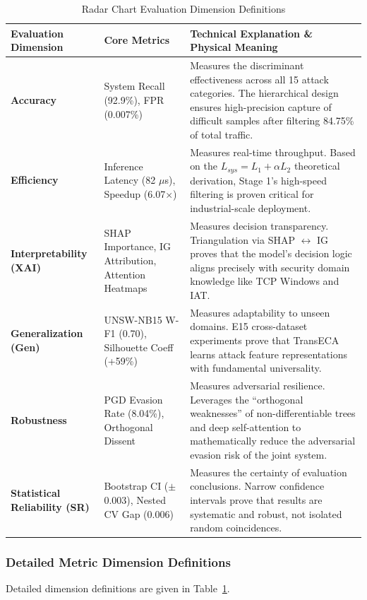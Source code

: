 \documentclass[sigconf]{acmart}
\begin{document}
\begin{table}[!t]
\caption{Radar Chart Evaluation Dimension Definitions}
\label{tab:radar_dimensions}
\begin{tabular}{p{3.0cm}p{5.4cm}p{7.9cm}}
\toprule
\textbf{Evaluation Dimension} & \textbf{Core Metrics} & \textbf{Technical Explanation \& Physical Meaning} \\
\midrule
\textbf{Accuracy} & System Recall (92.9\%), FPR (0.007\%) & Measures the discriminant effectiveness across all 15 attack categories. The hierarchical design ensures high-precision capture of difficult samples after filtering 84.75\% of total traffic. \\
\textbf{Efficiency} & Inference Latency (82 $\mu$s), Speedup (6.07$\times$) & Measures real-time throughput. Based on the $L_{sys} = L_1 + \alpha L_2$ theoretical derivation, Stage 1's high-speed filtering is proven critical for industrial-scale deployment. \\
\textbf{Interpretability (XAI)} & SHAP Importance, IG Attribution, Attention Heatmaps & Measures decision transparency. Triangulation via SHAP $\leftrightarrow$ IG proves that the model's decision logic aligns precisely with security domain knowledge like TCP Windows and IAT. \\
\textbf{Generalization (Gen)} & UNSW-NB15 W-F1 (0.70), Silhouette Coeff (+59\%) & Measures adaptability to unseen domains. E15 cross-dataset experiments prove that TransECA learns attack feature representations with fundamental universality. \\
\textbf{Robustness} & PGD Evasion Rate (8.04\%), Orthogonal Dissent & Measures adversarial resilience. Leverages the ``orthogonal weaknesses'' of non-differentiable trees and deep self-attention to mathematically reduce the adversarial evasion risk of the joint system. \\
\textbf{Statistical Reliability (SR)} & Bootstrap CI ($\pm$0.003), Nested CV Gap (0.006) & Measures the certainty of evaluation conclusions. Narrow confidence intervals prove that results are systematic and robust, not isolated random coincidences. \\
\bottomrule
\end{tabular}
\end{table}

\subsubsection{Detailed Metric Dimension Definitions} Detailed dimension definitions are given in Table~\ref{tab:radar_dimensions}.
\end{document}
